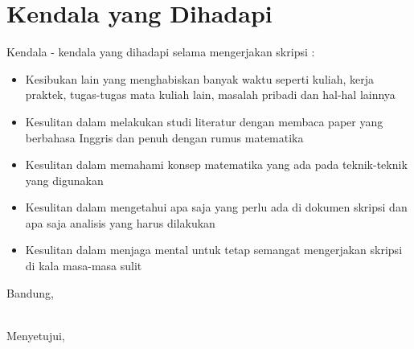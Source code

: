 \documentclass[a4paper,twoside]{article}
\begin{document}
\section{Kendala yang Dihadapi}
Kendala - kendala yang dihadapi selama mengerjakan skripsi :
\begin{itemize}
	\item Kesibukan lain yang menghabiskan banyak waktu seperti kuliah, kerja praktek, tugas-tugas mata kuliah lain, masalah pribadi dan hal-hal lainnya
	\item Kesulitan dalam melakukan studi literatur dengan membaca paper yang berbahasa Inggris dan penuh dengan rumus matematika
	\item Kesulitan dalam memahami konsep matematika yang ada pada teknik-teknik yang digunakan
	\item Kesulitan dalam mengetahui apa saja yang perlu ada di dokumen skripsi dan apa saja analisis yang harus dilakukan
	\item Kesulitan dalam menjaga mental untuk tetap semangat mengerjakan skripsi di kala masa-masa sulit
\end{itemize}

\vspace{1cm}
\centering Bandung, \tanggal\\
\vspace{2cm} \nama \\ 
\vspace{1cm}

Menyetujui, \\
\end{document}
